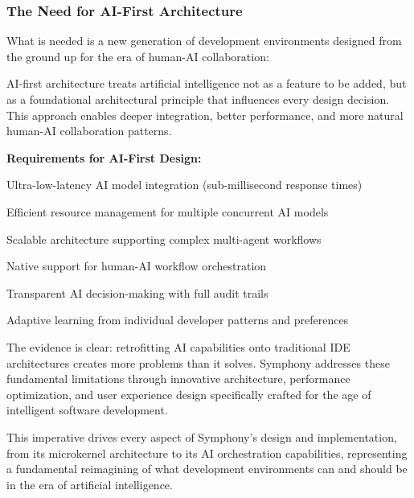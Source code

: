 \subsubsection{The Need for AI-First Architecture}

What is needed is a new generation of development environments designed from the ground up for the era of human-AI collaboration:

\begin{infobox}[title=AI-First Design Principles]
AI-first architecture treats artificial intelligence not as a feature to be added, but as a foundational architectural principle that influences every design decision. This approach enables deeper integration, better performance, and more natural human-AI collaboration patterns.
\end{infobox}

\textbf{Requirements for AI-First Design:}

\begin{compactlist}
    \item Ultra-low-latency AI model integration (sub-millisecond response times)
    \item Efficient resource management for multiple concurrent AI models
    \item Scalable architecture supporting complex multi-agent workflows
    \item Native support for human-AI workflow orchestration
    \item Transparent AI decision-making with full audit trails
    \item Adaptive learning from individual developer patterns and preferences
\end{compactlist}

The evidence is clear: retrofitting AI capabilities onto traditional IDE architectures creates more problems than it solves. Symphony addresses these fundamental limitations through innovative architecture, performance optimization, and user experience design specifically crafted for the age of intelligent software development.

This imperative drives every aspect of Symphony's design and implementation, from its microkernel architecture to its AI orchestration capabilities, representing a fundamental reimagining of what development environments can and should be in the era of artificial intelligence.
